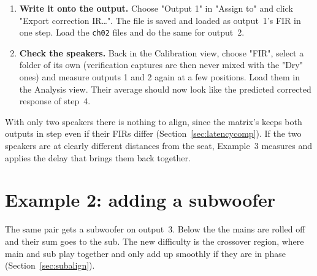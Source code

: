 \begin{enumerate}[nosep]
  \item \textbf{Write it onto the output.} Choose "Output 1" in "Assign to" and click "Export correction IR\ldots". The file is saved and loaded as output~1's FIR in one step. Load the \texttt{ch02} files and do the same for output~2.
  \item \textbf{Check the speakers.} Back in the Calibration view, choose "FIR", select a folder of its own (verification captures are then never mixed with the "Dry" ones) and measure outputs 1 and 2 again at a few positions. Load them in the Analysis view. Their average should now look like the predicted corrected response of step~4.
\end{enumerate}

\noindent With only two speakers there is nothing to align, since the matrix's  keeps both outputs in step even if their FIRs differ (Section~\ref{sec:latencycomp}). If the two speakers are at clearly different distances from the seat, Example~3 measures and applies the delay that brings them back together.

\section{Example 2: adding a subwoofer}\label{sec:ex-sub}

The same pair gets a subwoofer on output~3. Below the  the mains are rolled off and their sum goes to the sub. The new difficulty is the crossover region, where main and sub play together and only add up smoothly if they are in phase (Section~\ref{sec:subalign}).

